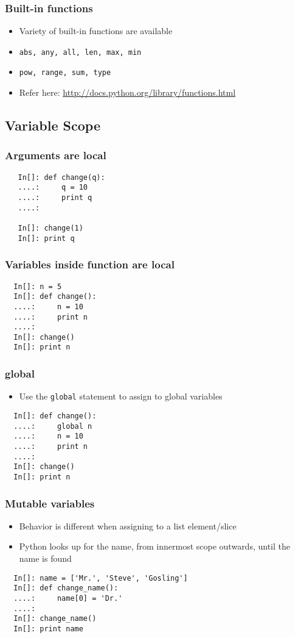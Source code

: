 \begin{frame}[fragile]
  \frametitle{Built-in functions}
  \begin{itemize}
  \item Variety of built-in functions are available
  \item \texttt{abs, any, all, len, max, min}
  \item \texttt{pow, range, sum, type}
  \item Refer here:
    \url{http://docs.python.org/library/functions.html}
  \end{itemize}
\end{frame}

\subsection*{Variable Scope}

\begin{frame}[fragile]
  \frametitle{Arguments are local}
  \begin{lstlisting}
   In[]: def change(q):
   ....:     q = 10
   ....:     print q
   ....:

   In[]: change(1)
   In[]: print q
  \end{lstlisting}
\end{frame}

\begin{frame}[fragile]
  \frametitle{Variables inside function are local}
  \begin{lstlisting}
  In[]: n = 5
  In[]: def change():
  ....:     n = 10
  ....:     print n
  ....:
  In[]: change()
  In[]: print n
  \end{lstlisting}
\end{frame}

\begin{frame}[fragile]
  \frametitle{global}
 \begin{itemize}
  \item Use the \texttt{global} statement to assign to global variables
  \end{itemize}
  \begin{lstlisting}
  In[]: def change():
  ....:     global n
  ....:     n = 10
  ....:     print n
  ....:
  In[]: change()
  In[]: print n
  \end{lstlisting}
\end{frame}  

\begin{frame}[fragile]
  \frametitle{Mutable variables}
  \begin{itemize}
  \item Behavior is different when assigning to a list element/slice
  \item Python looks up for the name, from innermost scope outwards,
    until the name is found
  \end{itemize}
  \begin{lstlisting}
  In[]: name = ['Mr.', 'Steve', 'Gosling']
  In[]: def change_name():
  ....:     name[0] = 'Dr.'
  ....:
  In[]: change_name()
  In[]: print name
  \end{lstlisting}
\end{frame}

